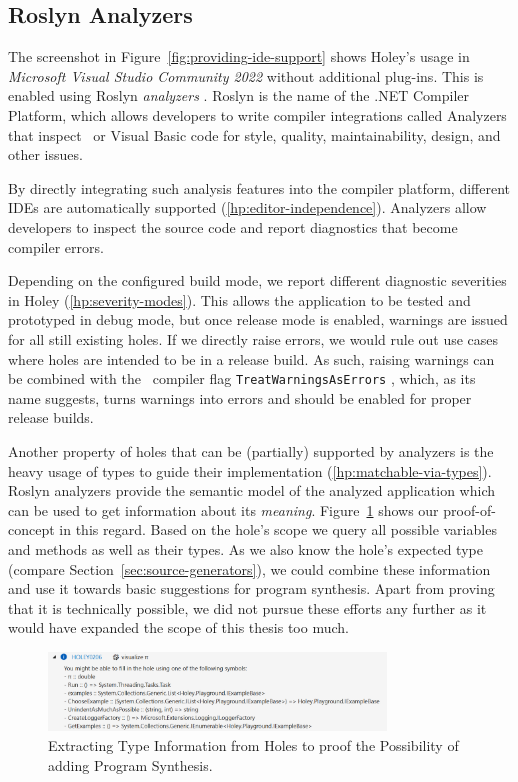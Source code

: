 \subsection{Roslyn Analyzers}
\label{sec:holey-roslyn-analyzers}
The screenshot in Figure~\ref{fig:providing-ide-support} shows Holey's usage in \emph{Microsoft Visual Studio Community 2022} without additional plug-ins.
This is enabled using Roslyn \emph{analyzers} \cite{microsoft_code_2023}.
Roslyn is the name of the .NET Compiler Platform, which allows developers to write compiler integrations called Analyzers that inspect \CS\ or Visual Basic code for style, quality, maintainability, design, and other issues.

By directly integrating such analysis features into the compiler platform, different IDEs are automatically supported (\ref{hp:editor-independence}).
Analyzers allow developers to inspect the source code and report diagnostics that become compiler errors.

Depending on the configured build mode, we report different diagnostic severities in Holey (\ref{hp:severity-modes}).
This allows the application to be tested and prototyped in debug mode, but once release mode is enabled, warnings are issued for all still existing holes.
If we directly raise errors, we would rule out use cases where holes are intended to be in a release build.
As such, raising warnings can be combined with the \CS\ compiler flag \verb|TreatWarningsAsErrors| \cite{microsoft_c_2023}, which, as its name suggests, turns warnings into errors and should be enabled for proper release builds.

Another property of holes that can be (partially) supported by analyzers is the heavy usage of types to guide their implementation (\ref{hp:matchable-via-types}).
Roslyn analyzers provide the semantic model of the analyzed application which can be used to get information about its \emph{meaning}.
Figure~\ref{fig:reporting-types} shows our proof-of-concept in this regard.
Based on the hole's scope we query all possible variables and methods as well as their types.
As we also know the hole's expected type (compare Section~\ref{sec:source-generators}), we could combine these information and use it towards basic suggestions for program synthesis.
Apart from proving that it is technically possible, we did not pursue these efforts any further as it would have expanded the scope of this thesis too much.

\begin{figure}[ht]
    \centering
    \includegraphics[width=0.8\textwidth]{images/reporting-types}
    \caption{Extracting Type Information from Holes to proof the Possibility of adding Program Synthesis.}
    \label{fig:reporting-types}
\end{figure}

